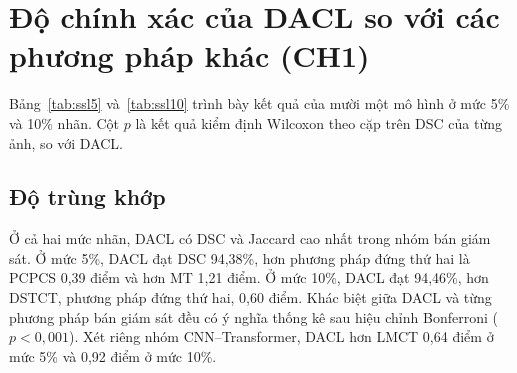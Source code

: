 \section{Độ chính xác của DACL so với các phương pháp khác (CH1)}
\label{sec:res-rq1}

Bảng~\ref{tab:ssl5} và~\ref{tab:ssl10} trình bày kết quả của mười một mô hình ở mức 5\% và 10\% nhãn. Cột $p$ là kết quả kiểm định Wilcoxon theo cặp trên DSC của từng ảnh, so với DACL.

\begin{table}[p]
\centering
\caption{Kết quả trên tập kiểm thử với 5\% ảnh có nhãn. DSC và Jaccard tính bằng \%, HD95 và ASD tính bằng điểm ảnh ở độ phân giải $224\times224$. Trong nhóm bán giám sát, giá trị tốt nhất được \textbf{in đậm} và tốt thứ hai được \textit{in nghiêng}. Cột $p$: kiểm định Wilcoxon theo cặp trên DSC của từng ảnh so với DACL; ngưỡng ý nghĩa sau hiệu chỉnh Bonferroni là 0,005.}
\label{tab:ssl5}
\end{table}

\begin{table}[p]
\centering
\caption{Kết quả trên tập kiểm thử với 10\% ảnh có nhãn. Quy ước như Bảng~\ref{tab:ssl5}.}
\label{tab:ssl10}
\end{table}

\subsection{Độ trùng khớp}

Ở cả hai mức nhãn, DACL có DSC và Jaccard cao nhất trong nhóm bán giám sát. Ở mức 5\%, DACL đạt DSC 94,38\%, hơn phương pháp đứng thứ hai là PCPCS 0,39 điểm và hơn MT 1,21 điểm. Ở mức 10\%, DACL đạt 94,46\%, hơn DSTCT, phương pháp đứng thứ hai, 0,60 điểm. Khác biệt giữa DACL và từng phương pháp bán giám sát đều có ý nghĩa thống kê sau hiệu chỉnh Bonferroni ($p<0{,}001$). Xét riêng nhóm CNN--Transformer, DACL hơn LMCT 0,64 điểm ở mức 5\% và 0,92 điểm ở mức 10\%.

